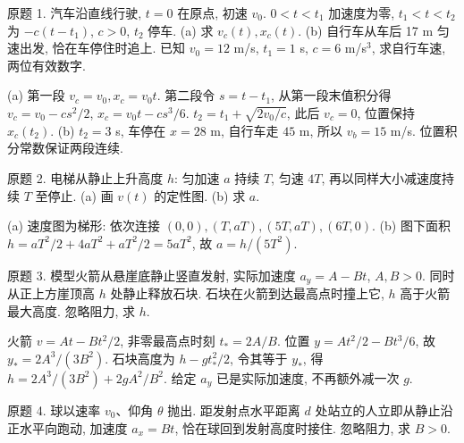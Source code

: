 \begin{exercise}\label{ps1:1}
原题 1. 汽车沿直线行驶, $t=0$ 在原点, 初速 $v_0$. $0<t<t_1$ 加速度为零, $t_1<t<t_2$ 为 $-c(t-t_1)$, $c>0$, $t_2$ 停车. (a) 求 $v_c(t),x_c(t)$. (b) 自行车从车后 17 m 匀速出发, 恰在车停住时追上. 已知 $v_0=12$ m/s, $t_1=1$ s, $c=6$ m/s$^3$, 求自行车速, 两位有效数字.
\end{exercise}
\begin{solution}
(a) 第一段 $v_c=v_0,x_c=v_0t$. 第二段令 $s=t-t_1$, 从第一段末值积分得 $v_c=v_0-cs^2/2$, $x_c=v_0t-cs^3/6$. $t_2=t_1+\sqrt{2v_0/c}$, 此后 $v_c=0$, 位置保持 $x_c(t_2)$. (b) $t_2=3$ s, 车停在 $x=28$ m, 自行车走 $45$ m, 所以 $v_b=15$ m/s. 位置积分常数保证两段连续.
\end{solution}
\begin{exercise}
原题 2. 电梯从静止上升高度 $h$: 匀加速 $a$ 持续 $T$, 匀速 $4T$, 再以同样大小减速度持续 $T$ 至停止. (a) 画 $v(t)$ 的定性图. (b) 求 $a$.
\end{exercise}
\begin{solution}
(a) 速度图为梯形: 依次连接 $(0,0),(T,aT),(5T,aT),(6T,0)$. (b) 图下面积 $h=aT^2/2+4aT^2+aT^2/2=5aT^2$, 故 $a=h/(5T^2)$.
\begin{center}\end{center}
\end{solution}
\begin{exercise}
原题 3. 模型火箭从悬崖底静止竖直发射, 实际加速度 $a_y=A-Bt$, $A,B>0$. 同时从正上方崖顶高 $h$ 处静止释放石块. 石块在火箭到达最高点时撞上它, $h$ 高于火箭最大高度. 忽略阻力, 求 $h$.
\end{exercise}
\begin{solution}
火箭 $v=At-Bt^2/2$, 非零最高点时刻 $t_*=2A/B$. 位置 $y=At^2/2-Bt^3/6$, 故 $y_*=2A^3/(3B^2)$. 石块高度为 $h-gt_*^2/2$, 令其等于 $y_*$, 得 $h=2A^3/(3B^2)+2gA^2/B^2$. 给定 $a_y$ 已是实际加速度, 不再额外减一次 $g$.
\end{solution}
\begin{exercise}
原题 4. 球以速率 $v_0$、仰角 $\theta$ 抛出. 距发射点水平距离 $d$ 处站立的人立即从静止沿正水平向跑动, 加速度 $a_x=Bt$, 恰在球回到发射高度时接住. 忽略阻力, 求 $B>0$.
\end{exercise}
